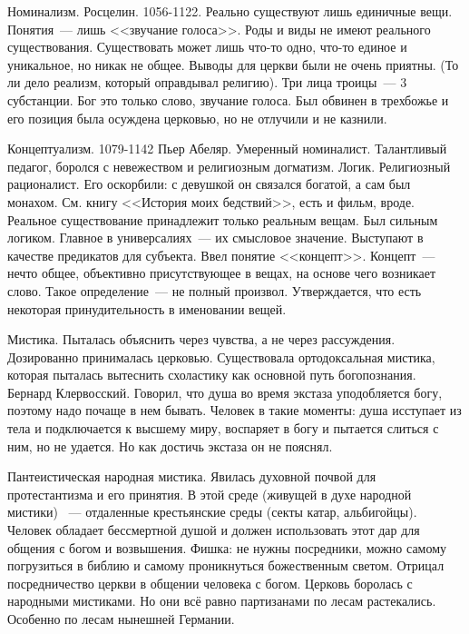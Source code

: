 Номинализм.
Росцелин. 1056-1122. Реально существуют лишь единичные вещи. Понятия~--- лишь <<звучание голоса>>. Роды и виды не имеют реального существования. Существовать может лишь что-то одно, что-то единое и уникальное, но никак не общее. Выводы для церкви были не очень приятны. (То ли дело реализм, который оправдывал религию). Три лица троицы~--- 3 субстанции. Бог это только слово, звучание голоса. Был обвинен в трехбожье и его позиция была осуждена церковью, но не отлучили и не казнили.

Концептуализм. 1079-1142 Пьер Абеляр. Умеренный номиналист. Талантливый педагог, боролся с невежеством и религиозным догматизм. Логик. Религиозный рационалист. Его оскорбили: с девушкой он связался богатой, а сам был монахом. См. книгу <<История моих бедствий>>, есть и фильм, вроде. Реальное существование принадлежит только реальным вещам. Был сильным логиком. Главное в универсалиях~--- их смысловое значение. Выступают в качестве предикатов для субъекта. Ввел понятие <<концепт>>. Концепт~--- нечто общее, объективно присутствующее в вещах, на основе чего возникает слово. Такое определение~--- не полный произвол. Утверждается, что есть некоторая принудительность в именовании вещей.

Мистика. Пыталась объяснить через чувства, а не через рассуждения. Дозированно принималась церковью. Существовала ортодоксальная мистика, которая пыталась вытеснить схоластику как основной путь богопознания. Бернард Клервосский. Говорил, что душа во время экстаза уподобляется богу, поэтому надо почаще в нем бывать. Человек в такие моменты: душа исступает из тела и подключается к высшему миру, воспаряет в богу и пытается слиться с ним, но не удается. Но как достичь экстаза он не пояснял.

Пантеистическая народная мистика. Явилась духовной почвой для протестантизма и его принятия. В этой среде (живущей в духе народной мистики) ~--- отдаленные крестьянские среды (секты катар, альбигойцы). Человек обладает бессмертной душой и должен использовать этот дар для общения с богом и возвышения. Фишка: не нужны посредники, можно самому погрузиться в библию и самому проникнуться божественным светом. Отрицал посредничество церкви в общении человека с богом. Церковь боролась с народными мистиками. Но они всё равно партизанами по лесам растекались. Особенно по лесам нынешней Германии.

